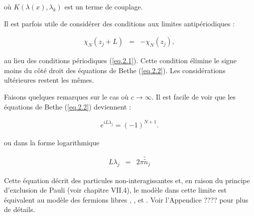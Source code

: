 où \( K(\lambda(x), \lambda_k) \) est un terme de couplage.

Il est parfois utile de considérer des conditions aux limites antipériodiques :

\begin{eqnarray}
	\chi_N(z_j + L) &  =  & -\chi_N(z_j),	
\end{eqnarray}

au lieu des conditions périodiques (\ref{eq.2.1}). Cette condition élimine le signe moins du côté droit des équations de Bethe (\ref{eq.2.2}). Les considérations ultérieures restent les mêmes.

Faisons quelques remarques sur le cas où \( c \to \infty \). Il est facile de voir que les équations de Bethe (\ref{eq.2.2}) deviennent :

\begin{eqnarray}
	e^{i L \lambda_j} = (-1)^{N+1}.	
\end{eqnarray}

ou dans la forme logarithmique

\begin{eqnarray}
	 L \lambda_j & = & 2 \pi \tilde{\tilde{n}}_j 	
\end{eqnarray}


Cette équation décrit des particules non-interagissantes et, en raison du principe d'exclusion de Pauli (voir chapitre VII.4), le modèle dans cette limite est équivalent au modèle des fermions libres \cite{ref1}, \cite{ref2}, et \cite{ref3}. Voir l'Appendice ???? pour plus de détails.











